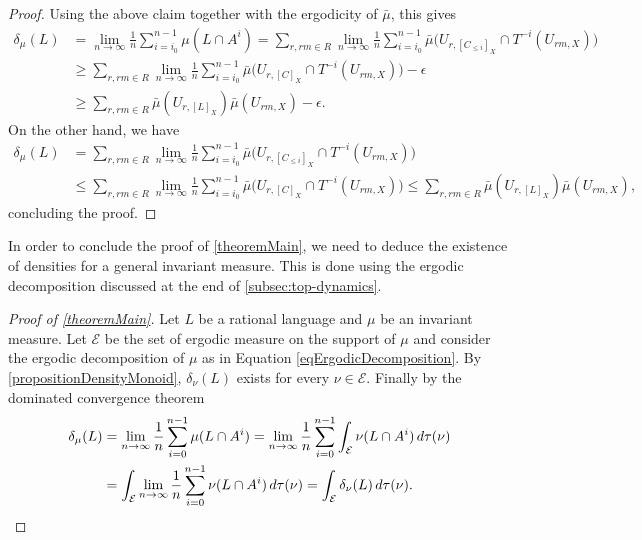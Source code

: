 \documentclass[a4paper,UKenglish,numberwithinsect,cleveref]{lipics-v2021}
\begin{document}
\begin{proof}
    Using the above claim together with the ergodicity of $\bar\mu$, this gives
    \begin{align*} 
        \delta_\mu(L)&=\lim_{n\to\infty}\frac{1}{n}\sum_{i=i_0}^{n-1}\mu(L\cap A^i)
        =\sum_{r,rm\in R}\lim_{n\to\infty}\frac{1}{n}\sum_{i=i_0}^{n-1}\bar\mu\bigl(U_{r,[C_{\le i}]_X}\cap T^{-i}(U_{rm,X})\bigr)\\
        &\ge\sum_{r, rm\in R}\lim_{n\to\infty}\frac{1}{n}\sum_{i=i_0}^{n-1}\bar\mu\bigl(U_{r,[C]_X}\cap T^{-i}(U_{rm,X})\bigr)-\epsilon\\
        &\ge\sum_{r, rm\in R}\bar\mu(U_{r,[L]_X})\bar\mu(U_{rm,X})-\epsilon.
    \end{align*}
    On the other hand, we have
    \begin{align*}
        \delta_\mu(L)&=\sum_{r, rm\in R}\lim_{n\to\infty}\frac{1}{n}\sum_{i=i_0}^{n-1}\bar\mu\bigl(U_{r,[C_{\le i}]_X}\cap T^{-i}(U_{rm,X})\bigr)\\
        &\le\sum_{r, rm\in R}\lim_{n\to\infty}\frac{1}{n}\sum_{i=i_0}^{n-1}\bar\mu\bigl(U_{r,[C]_X}\cap T^{-i}(U_{rm,X})\bigr)
        \le\sum_{r, rm\in R}\bar\mu(U_{r,[L]_X})\bar\mu(U_{rm,X}),
     \end{align*}
    concluding the proof.
\end{proof}

In order to conclude the proof of \cref{theoremMain}, we need to deduce the existence
of densities for a general invariant measure. This is done using the ergodic decomposition
discussed at the end of \cref{subsec:top-dynamics}. 
\begin{proof}[Proof of \cref{theoremMain}]
    Let $L$ be a rational language and $\mu$ be an invariant measure. Let $\mathcal E$ be the set
    of ergodic measure on the support of $\mu$ and consider the ergodic
    decomposition of $\mu$ as in Equation \eqref{eqErgodicDecomposition}. By
    \cref{propositionDensityMonoid}, $\delta_\nu(L)$ exists for every 
    $\nu\in\mathcal{E}$. Finally by the dominated convergence theorem 
    \begin{align*}
        \delta_\mu(L)&=\lim_{n\to\infty}\frac{1}{n}\sum_{i=0}^{n-1}\mu(L\cap A^i) 
        =\lim_{n\to\infty}\frac{1}{n}\sum_{i=0}^{n-1}\int_{\mathcal E}\nu(L\cap A^i) \, d\tau(\nu)\\
        &=\int_{\mathcal E}\lim_{n\to\infty}\frac{1}{n}\sum_{i=0}^{n-1}\nu(L\cap A^i) \, d\tau(\nu)
        =\int_{\mathcal E}\delta_\nu(L) \, d\tau(\nu).\qedhere
    \end{align*}
\end{proof}
\end{document}
